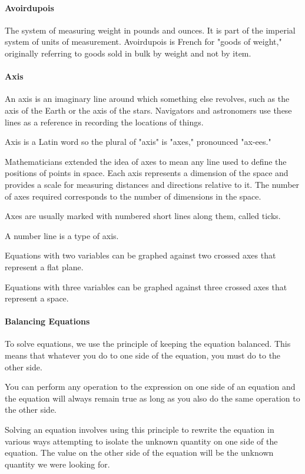 \documentclass[12pt]{article}
\begin{document}
\paragraph{Avoirdupois}
The system of measuring weight in pounds and ounces. It is part of the imperial system of units of measurement. Avoirdupois is French for "goods of weight," originally referring to goods sold in bulk by weight and not by item.

\paragraph{Axis}
An axis is an imaginary line around which something else revolves, such as the axis of the Earth or the axis of the stars. Navigators and astronomers use these lines as a reference in recording the locations of things.

Axis is a Latin word so the plural of "axis" is "axes," pronounced "ax-ees."

Mathematicians extended the idea of axes to mean any line used to define the positions of points in space. Each axis represents a dimension of the space and provides a scale for measuring distances and directions relative to it. The number of axes required corresponds to the number of dimensions in the space.

Axes are usually marked with numbered short lines along them, called ticks.

A number line is a type of axis.

Equations with two variables can be graphed against two crossed axes that represent a flat plane.

Equations with three variables can be graphed against three crossed axes that represent a space.

\paragraph{Balancing Equations}
To solve equations, we use the principle of keeping the equation balanced. This means that whatever you do to one side of the equation, you must do to the other side.

You can perform any operation to the expression on one side of an equation and the equation will always remain true as long as you also do the same operation to the other side.

Solving an equation involves using this principle to rewrite the equation in various ways attempting to isolate the unknown quantity on one side of the equation. The value on the other side of the equation will be the unknown quantity we were looking for.
\end{document}
